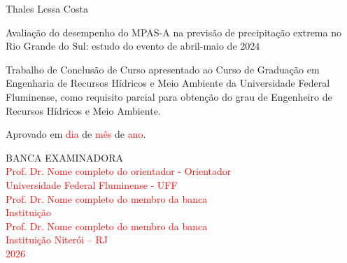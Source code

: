 \documentclass[12pt,a4paper,oneside]{book}
\begin{document}
\begin{center}
Thales Lessa Costa

\vspace{1cm}
Avaliação do desempenho do MPAS-A na previsão de precipitação extrema no Rio Grande do Sul: estudo do evento de abril-maio de 2024

\vspace{1cm}
\begin{flushright}
\begin{minipage}{0.55\textwidth}
Trabalho de Conclusão de Curso apresentado ao Curso de Graduação em Engenharia de Recursos Hídricos e Meio Ambiente da Universidade Federal Fluminense, como requisito parcial para obtenção do grau de Engenheiro de Recursos Hídricos e Meio Ambiente.
\end{minipage}
\end{flushright}

\vfill
\begin{flushleft}
Aprovado em \textcolor{red}{dia} de \textcolor{red}{mês} de \textcolor{red}{ano}.
\end{flushleft}
\vfill
BANCA EXAMINADORA
\vfill
\hrulefill\\
\textcolor{red}{Prof. Dr. Nome completo do orientador - Orientador}\\
\textcolor{red}{Universidade Federal Fluminense - UFF}
\vfill
\hrulefill\\
\textcolor{red}{Prof. Dr. Nome completo do membro da banca}\\
\textcolor{red}{Instituição}
\vfill
\hrulefill\\
\textcolor{red}{Prof. Dr. Nome completo do membro da banca}\\
\textcolor{red}{Instituição}
\vfill
\textcolor{red}{Niterói -- RJ}\\
\textcolor{red}{2026}
\end{center}
\pagebreak
\end{document}
